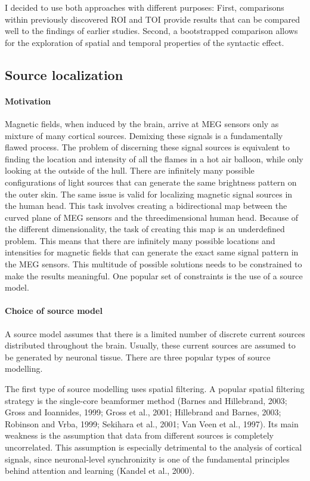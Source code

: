 I decided to use both approaches with different purposes:
First, comparisons within previously discovered ROI and TOI provide results that can be compared well to the findings of earlier studies.
Second, a bootstrapped comparison allows for the exploration of spatial and temporal properties of the syntactic effect.

\subsection{Source localization}

\paragraph{Motivation}
Magnetic fields, when induced by the brain, arrive at MEG sensors only as mixture of many cortical sources.
Demixing these signals is a fundamentally flawed process.
The problem of discerning these signal sources is equivalent to finding the location and intensity of all the flames in a hot air balloon, while only looking at the outside of the hull.
There are infinitely many possible configurations of light sources that can generate the same brightness pattern on the outer skin.
The same issue is valid for localizing magnetic signal sources in the human head.
This task involves creating a bidirectional map between the curved plane of MEG sensors and the threedimensional human head.
Because of the different dimensionality, the task of creating this map is an underdefined problem.
This means that there are infinitely many possible locations and intensities for magnetic fields that can generate the exact same signal pattern in the MEG sensors.
This multitude of possible solutions needs to be constrained to make the results meaningful.
One popular set of constraints is the use of a source model.

\paragraph{Choice of source model}
A source model assumes that there is a limited number of discrete current sources distributed throughout the brain.
Usually, these current sources are assumed to be generated by neuronal tissue.
There are three popular types of source modelling.

The first type of source modelling uses spatial filtering.
A popular spatial filtering strategy is the single-core beamformer method (Barnes and Hillebrand, 2003; Gross and Ioannides, 1999; Gross et al., 2001; Hillebrand and Barnes, 2003; Robinson and Vrba, 1999; Sekihara et al., 2001; Van Veen et al., 1997).
Its main weakness is the assumption that data from different sources is completely uncorrelated.
This assumption is especially detrimental to the analysis of cortical signals, since neuronal-level synchronizity is one of the fundamental principles behind attention and learning (Kandel et al., 2000).

